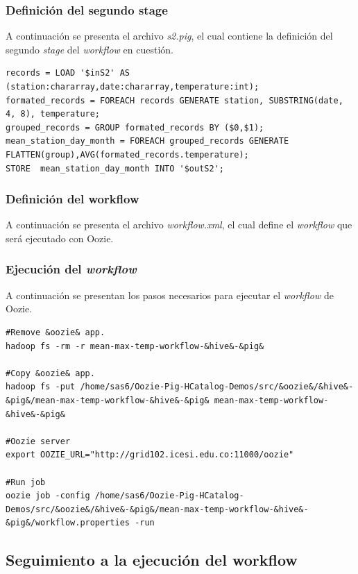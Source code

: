 \subsubsection{Definición del segundo stage} A continuación se presenta el archivo \textit{s2.pig}, el cual contiene la definición del segundo \textit{stage} del \textit{workflow} en cuestión.

\begin{lstlisting}[linewidth=\columnwidth,breaklines=true]
records = LOAD '$inS2' AS (station:chararray,date:chararray,temperature:int);
formated_records = FOREACH records GENERATE station, SUBSTRING(date, 4, 8), temperature;
grouped_records = GROUP formated_records BY ($0,$1);
mean_station_day_month = FOREACH grouped_records GENERATE FLATTEN(group),AVG(formated_records.temperature);
STORE  mean_station_day_month INTO '$outS2';
\end{lstlisting}

\subsubsection{Definición del workflow} A continuación se presenta el archivo \textit{workflow.xml}, el cual define el \textit{workflow} que será ejecutado con Oozie.



\subsubsection{Ejecución del \textit{workflow}} A continuación se presentan los pasos necesarios para ejecutar el \textit{workflow} de Oozie.

\begin{lstlisting}[linewidth=\columnwidth,breaklines=true]
#Remove &oozie& app.
hadoop fs -rm -r mean-max-temp-workflow-&hive&-&pig&

#Copy &oozie& app.
hadoop fs -put /home/sas6/Oozie-Pig-HCatalog-Demos/src/&oozie&/&hive&-&pig&/mean-max-temp-workflow-&hive&-&pig& mean-max-temp-workflow-&hive&-&pig&

#Oozie server
export OOZIE_URL="http://grid102.icesi.edu.co:11000/oozie"

#Run job
oozie job -config /home/sas6/Oozie-Pig-HCatalog-Demos/src/&oozie&/&hive&-&pig&/mean-max-temp-workflow-&hive&-&pig&/workflow.properties -run
\end{lstlisting}



\subsection{Seguimiento a la ejecución del workflow}

